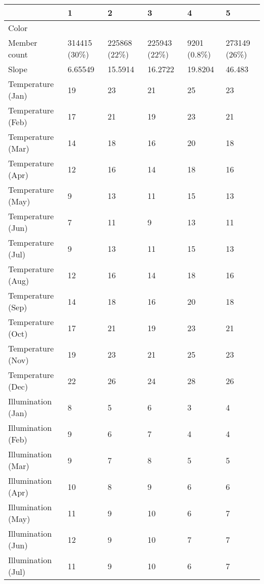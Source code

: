 \begin{table}[]
  \centering
	    \begin{tabular}{|p{5cm}|p{2cm}|p{2cm}|p{2cm}|p{2cm}|p{2cm}|}
		\hline	
  	     & \textbf{1} &  \textbf{2} & \textbf{3} & \textbf{4} & \textbf{5} \\
		\hline
  	    Color & \cellcolor{cluster_1} & \cellcolor{cluster_2} & \cellcolor{cluster_3} & \cellcolor{cluster_4} & \cellcolor{cluster_5} \\
		\hline
  	    Member count & 314415 (30\%)  & 225868 (22\%) & 225943 (22\%)  & 9201 (0.8\%) & 273149 (26\%) \\
		\hline
  	    Slope & 6.65549 & 15.5914 & 16.2722 & 19.8204 & 46.483 \\
		\hline
  	    Temperature (Jan) & 19 & 23 & 21 & 25 & 23 \\
		\hline
  	    Temperature (Feb) & 17 & 21 & 19 & 23 & 21 \\
		\hline
  	    Temperature (Mar) & 14 & 18 & 16 & 20 & 18 \\
		\hline
  	    Temperature (Apr) & 12 & 16 & 14 & 18 & 16 \\
		\hline
  	    Temperature (May) & 9 & 13 & 11 & 15 & 13 \\
		\hline
		Temperature (Jun) & 7 & 11 & 9 & 13 & 11 \\
		\hline
		Temperature (Jul) & 9 & 13 & 11 & 15 & 13 \\
		\hline
		Temperature (Aug) & 12 & 16 & 14 & 18 & 16 \\
		\hline
		Temperature (Sep) & 14 & 18 & 16 & 20 & 18 \\
		\hline
		Temperature (Oct) & 17 & 21 & 19 & 23 & 21 \\
		\hline
		Temperature (Nov) & 19 & 23 & 21 & 25 & 23 \\
		\hline
		Temperature (Dec) & 22 & 26 & 24 & 28 & 26 \\
		\hline
  	    Illumination (Jan) & 8 & 5 & 6 & 3 & 4 \\
		\hline
  	    Illumination (Feb) & 9 & 6 & 7 & 4 & 4 \\
		\hline
  	    Illumination (Mar) & 9 & 7 & 8 & 5 & 5 \\
		\hline
  	    Illumination (Apr) & 10 & 8 & 9 & 6 & 6 \\
		\hline
  	    Illumination (May) & 11 & 9 & 10 & 6 & 7 \\
		\hline
		Illumination (Jun) & 12 & 9 & 10 & 7 & 7 \\
		\hline
		Illumination (Jul) & 11 & 9 & 10 & 6 & 7 \\

\end{tabular}
\end{table}
